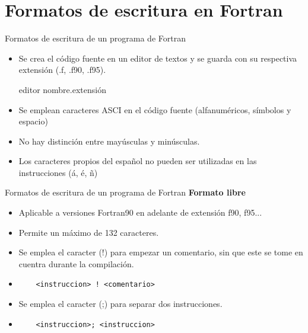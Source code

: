 
\section{Formatos de escritura en Fortran}


\begin{frame}[fragile]{Formatos de escritura de un programa de Fortran}
  \begin{itemize}[<+(1)->]
  \item Se crea el código fuente en un editor de textos y se guarda con su respectiva extensión (.f, .f90, .f95).
    \begin{mintedbash} 
      editor nombre.extensión
    \end{mintedbash}
  \item Se emplean caracteres ASCI en el código fuente (alfanuméricos, símbolos y espacio)
  \item No hay distinción entre mayúsculas y minúsculas.
  \item Los caracteres propios del español no pueden ser utilizadas en las instrucciones (á, é, ñ)
  \end{itemize}
\end{frame}

\begin{frame}[fragile]{Formatos de escritura de un programa de Fortran}
 \textbf{Formato libre}
  \begin{itemize}[<+(1)->]
   \item Aplicable a versiones Fortran90 en adelante de extensión f90, f95...  
   \item Permite un máximo de 132 caracteres.
   \item Se emplea el caracter (!) para empezar un comentario, sin que este se tome en cuentra durante la compilación.
   \vspace{0.1cm}
   \item [] 
    \begin{verbatim}
    <instruccion> ! <comentario>
    \end{verbatim}
   \item Se emplea el caracter (;) para separar dos instrucciones.
   \vspace{0.1cm}
   \item [] 
    \begin{verbatim}
    <instruccion>; <instruccion>
    \end{verbatim}
  \end{itemize}
\end{frame} 

